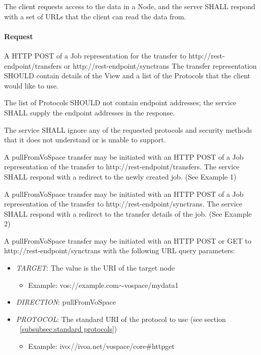 \documentclass[11pt,a4paper]{ivoa}
\begin{document}
The client requests access to the data in a Node, and the server SHALL respond with a set of URLs that the client can read the data from.

\paragraph{Request}
A HTTP POST of a Job representation for the transfer to http://rest-endpoint/transfers or http://rest-endpoint/synctrans
The transfer representation SHOULD contain details of the View and a list of the Protocols that the client would like to use.

The list of Protocols SHOULD not contain endpoint addresses; the service SHALL supply the endpoint addresses in the response.

The service SHALL ignore any of the requested protocols and security methods that it does not understand or is unable to support.

A pullFromVoSpace transfer may be initiated with an HTTP POST of a Job representation of the transfer to http://rest-endpoint/transfers. The service SHALL respond with a redirect to the newly created job.  (See Example 1)

A pullFromVoSpace transfer may be initiated with an HTTP POST of a Job representation of the transfer to http://rest-endpoint/synctrans. The service SHALL respond with a redirect to the transfer details of the job.  (See Example 2)

A pullFromVoSpace transfer may be initiated with an HTTP POST or GET to http://rest-endpoint/synctrans with the following URL query parameters:
\begin{itemize}
    \item \emph{TARGET}: The value is the URI of the target node
        \begin{itemize}
           \item Example:  vos://example.com$\mathtt{\sim}$vospace/mydata1
        \end{itemize}
    \item \emph{DIRECTION}: pullFromVoSpace
    \item \emph{PROTOCOL}: The standard URI of the protocol to use (see section ~\ref{subsubsec:standard protocols})
        \begin{itemize}
           \item Example: ivo://ivoa.net/vospace/core\#httpget
        \end{itemize}
\end{itemize}
\end{document}
